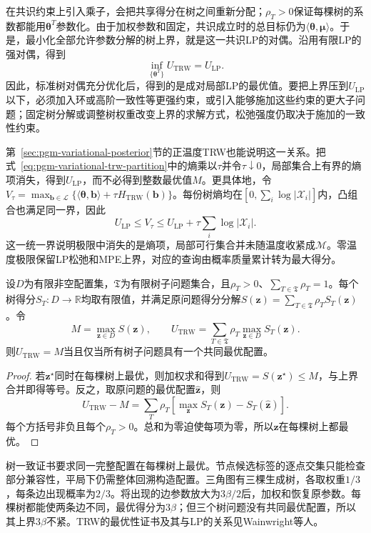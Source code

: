 在共识约束上引入乘子，会把共享得分在树之间重新分配；$\rho_T>0$保证每棵树的系数都能用$\bm\theta^T$参数化。由于加权参数和固定，共识成立时的总目标仍为$\langle\bm\theta,\bm\mu\rangle$。于是，最小化全部允许参数分解的树上界，就是这一共识LP的对偶。沿用有限LP的强对偶，得到
\[
  \inf_{\{\bm{\theta}^T\}}
     U_{\mathrm{TRW}}=U_{\mathrm{LP}}.
\]
因此，标准树对偶充分优化后，得到的是成对局部LP的最优值。要把上界压到$U_{\mathrm{LP}}$以下，必须加入环或高阶一致性等更强约束，或引入能够施加这些约束的更大子问题；固定树分解或调整树权重改变上界的求解方式，松弛强度仍取决于施加的一致性约束。

第~\ref{sec:pgm-variational-posterior}节的正温度TRW也能说明这一关系。把式~\eqref{eq:pgm-variational-trw-partition}中的熵乘以$\tau$并令$\tau\downarrow0$，局部集合上有界的熵项消失，得到$U_{\mathrm{LP}}$，而不必得到整数最优值$M$。更具体地，令$V_\tau=\max_{\bm b\in\mathcal L}\{\langle\bm\theta,\bm b\rangle+\tau H_{\mathrm{TRW}}(\bm b)\}$。每份树熵均在$[0,\sum_i\log|\mathcal X_i|]$内，凸组合也满足同一界，因此
\[
  U_{\mathrm{LP}}\leq V_\tau
    \leq U_{\mathrm{LP}}+\tau\sum_i\log|\mathcal X_i|.
\]
这一统一界说明极限中消失的是熵项，局部可行集合并未随温度收紧成$\mathcal M$。零温度极限保留LP松弛和MPE上界，对应的查询由概率质量累计转为最大得分。

\begin{lemma}[树一致的最优性证书]
  \label{lem:pgm-variational-tree-agreement}
  设$D$为有限非空配置集，$\mathfrak T$为有限树子问题集合，且$\rho_T>0$、$\sum_{T\in\mathfrak T}\rho_T=1$。每个树得分$S_T:D\to\mathbb R$均取有限值，并满足原问题得分分解$S(\bm z)=\sum_{T\in\mathfrak T}\rho_TS_T(\bm z)$。令
  \[
    M=\max_{\bm z\in D}S(\bm z),
    \qquad
    U_{\mathrm{TRW}}
      =\sum_{T\in\mathfrak T}\rho_T
         \max_{\bm z\in D}S_T(\bm z).
  \]
  则$U_{\mathrm{TRW}}=M$当且仅当所有树子问题具有一个共同最优配置。
\end{lemma}
\begin{proof}
  若$\bm z^\star$同时在每棵树上最优，则加权求和得到$U_{\mathrm{TRW}}=S(\bm z^\star)\leq M$，与上界合并即得等号。反之，取原问题的最优配置$\widehat{\bm z}$，则
  \[
    U_{\mathrm{TRW}}-M
      =\sum_T\rho_T
         \left[\max_{\bm z}S_T(\bm z)-S_T(\widehat{\bm z})\right].
  \]
  每个方括号非负且每个$\rho_T>0$。总和为零迫使每项为零，所以$\widehat{\bm z}$在每棵树上都最优。
\end{proof}

树一致证书要求同一完整配置在每棵树上最优。节点候选标签的逐点交集只能检查部分兼容性，平局下仍需整体回溯构造配置。三角图有三棵生成树，各取权重$1/3$，每条边出现概率为$2/3$。将出现的边参数放大为$3\beta/2$后，加权和恢复原参数。每棵树都能使两条边不同，最优得分为$3\beta$；但三个树问题没有共同最优配置，所以其上界$3\beta$不紧。TRW的最优性证书及其与LP的关系见Wainwright等人。

